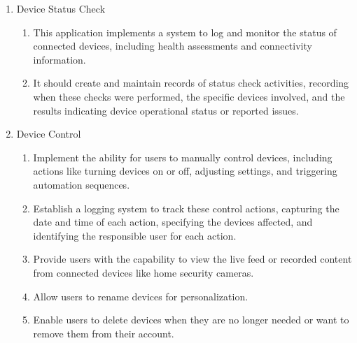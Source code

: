 \begin{enumerate}[label=\arabic*.]
\begin{enumerate}[label*={\arabic*.}]
              \item {\large{Device Status Check}}\\
                    \begin{enumerate}[label*={\arabic*.},ref=\theenumi.\arabic*]
                        \setlength{\itemindent}{0.5cm}
                        \item This application implements a system to log and monitor the status of connected devices, including health assessments and connectivity information.\\
                        \item It should create and maintain records of status check activities, recording when these checks were performed, the specific devices involved, and the results indicating device operational status or reported issues.\\
                    \end{enumerate}

              \item {\large{Device Control}}\\
                    \begin{enumerate}[label*={\arabic*.},ref=\theenumi.\arabic*]
                        \setlength{\itemindent}{0.5cm}
                        \item  Implement the ability for users to manually control devices, including actions like turning devices on or off, adjusting settings, and triggering automation sequences.\\
                        \item Establish a logging system to track these control actions, capturing the date and time of each action, specifying the devices affected, and identifying the responsible user for each action.\\
                        \item Provide users with the capability to view the live feed or recorded content from connected devices like home security cameras.\\
                        \item Allow users to rename devices for personalization.\\
                        \item Enable users to delete devices when they are no longer needed or want to remove them from their account.\\
                    \end{enumerate}
          \end{enumerate}


\end{enumerate}

